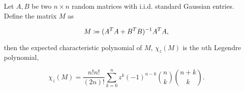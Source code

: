 \begin{theorem}
    Let $A,B$ be two $n\times n$ random matrices with i.i.d. standard Gaussian entries. Define the matrix $M$ as

    \begin{equation*}
        M \coloneqq (A^TA + B^TB)^{-1}A^TA,
    \end{equation*}

    then the expected characteristic polynomial of $M$, $\chi_z(M)$ is the $n$th Legendre polynomial,

    \begin{equation*}
        \chi_z(M) = \frac{n!n!}{(2n)!}\sum_{k=0}^n z^k(-1)^{n-k} \binom nk \binom{n+k}k.
    \end{equation*}
\end{theorem}

